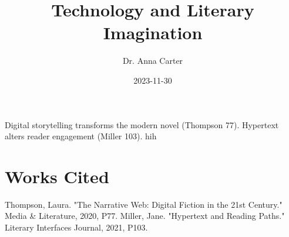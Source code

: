 \documentclass{article}
\title{Technology and Literary Imagination}
\author{Dr. Anna Carter}
\date{2023-11-30}
\begin{document}
\maketitle
Digital storytelling transforms the modern novel (Thompson 77). Hypertext alters reader engagement (Miller 103). hih

\section{Works Cited}
Thompson, Laura. "The Narrative Web: Digital Fiction in the 21st Century." Media \& Literature, 2020, P77.
Miller, Jane. "Hypertext and Reading Paths." Literary Interfaces Journal, 2021, P103.
\end{document}
